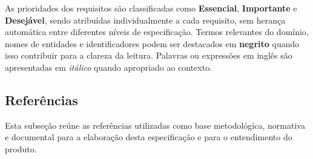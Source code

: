 As prioridades dos requisitos são classificadas como \textbf{Essencial}, \textbf{Importante} e \textbf{Desejável}, sendo atribuídas individualmente a cada requisito, sem herança automática entre diferentes níveis de especificação. Termos relevantes do domínio, nomes de entidades e identificadores podem ser destacados em \textbf{negrito} quando isso contribuir para a clareza da leitura. Palavras ou expressões em inglês são apresentadas em \textit{itálico} quando apropriado ao contexto.

\subsection{Referências}

Esta subseção reúne as referências utilizadas como base metodológica, normativa e documental para a elaboração desta especificação e para o entendimento do produto.

\nocite{iso29148}
\nocite{lgpd}
\printbibliography[heading=none]
